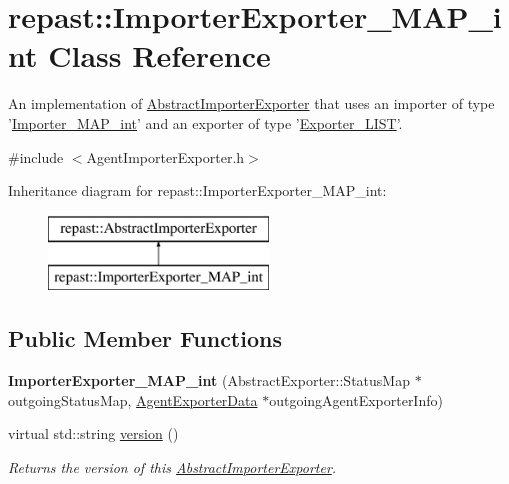 \hypertarget{classrepast_1_1_importer_exporter___m_a_p__int}{\section{repast\-:\-:Importer\-Exporter\-\_\-\-M\-A\-P\-\_\-int Class Reference}
\label{classrepast_1_1_importer_exporter___m_a_p__int}
}


An implementation of \hyperlink{classrepast_1_1_abstract_importer_exporter}{Abstract\-Importer\-Exporter} that uses an importer of type '\hyperlink{classrepast_1_1_importer___m_a_p__int}{Importer\-\_\-\-M\-A\-P\-\_\-int}' and an exporter of type '\hyperlink{classrepast_1_1_exporter___l_i_s_t}{Exporter\-\_\-\-L\-I\-S\-T}'.  




{\ttfamily \#include $<$Agent\-Importer\-Exporter.\-h$>$}

Inheritance diagram for repast\-:\-:Importer\-Exporter\-\_\-\-M\-A\-P\-\_\-int\-:\begin{figure}[H]
\begin{center}
\leavevmode
\includegraphics[height=2.000000cm]{classrepast_1_1_importer_exporter___m_a_p__int}
\end{center}
\end{figure}
\subsection*{Public Member Functions}
\begin{DoxyCompactItemize}
\item 
\hypertarget{classrepast_1_1_importer_exporter___m_a_p__int_a39fcbc169fddfb9c52b8b2cb80d3c4c9}{{\bfseries Importer\-Exporter\-\_\-\-M\-A\-P\-\_\-int} (Abstract\-Exporter\-::\-Status\-Map $\ast$outgoing\-Status\-Map, \hyperlink{classrepast_1_1_agent_exporter_data}{Agent\-Exporter\-Data} $\ast$outgoing\-Agent\-Exporter\-Info)}\label{classrepast_1_1_importer_exporter___m_a_p__int_a39fcbc169fddfb9c52b8b2cb80d3c4c9}

\item 
virtual std\-::string \hyperlink{classrepast_1_1_importer_exporter___m_a_p__int_a801fce0ea8f65aa5b23cc9b1cc9dd818}{version} ()
\begin{DoxyCompactList}\small\item\em Returns the version of this \hyperlink{classrepast_1_1_abstract_importer_exporter}{Abstract\-Importer\-Exporter}. \end{DoxyCompactList}\end{DoxyCompactItemize}
